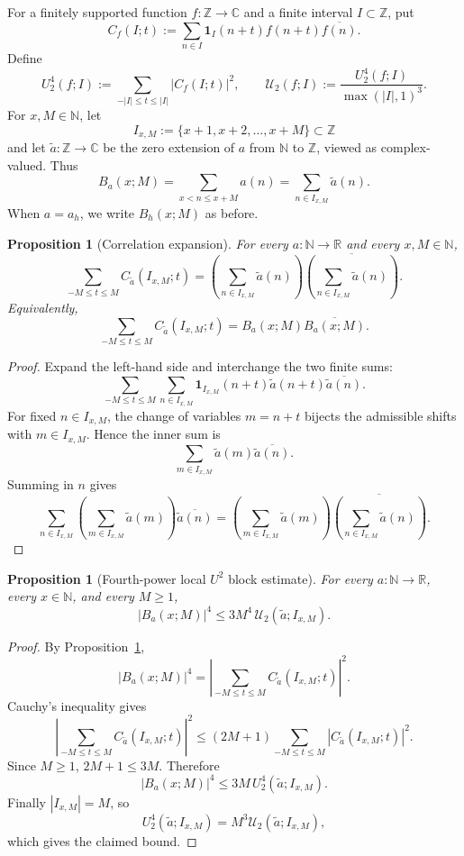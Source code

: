\documentclass[11pt]{scrartcl}
\numberwithin{equation}{section}
\newtheorem{proposition}[theorem]{Proposition}
\theoremstyle{definition}
\newcommand{\N}{\mathbb N}
\newcommand{\Z}{\mathbb Z}
\newcommand{\R}{\mathbb R}
\newcommand{\C}{\mathbb C}
\newcommand{\1}{\mathbf 1}
\newcommand{\abs}[1]{\left|#1\right|}
\begin{document}
For a finitely supported function $f:\Z\to\C$ and a finite interval $I\subset\Z$, put
\[
C_f(I;t):=\sum_{n\in I}\1_I(n+t)f(n+t)\overline{f(n)}.
\]
Define
\[
U_2^4(f;I):=\sum_{-|I|\le t\le |I|}\abs{C_f(I;t)}^2,
\qquad
\mathcal U_2(f;I):=\frac{U_2^4(f;I)}{\max(|I|,1)^3}.
\]
For $x,M\in\N$, let
\[
I_{x,M}:=\{x+1,x+2,\ldots,x+M\}\subset\Z
\]
and let $\widetilde a:\Z\to\C$ be the zero extension of $a$ from $\N$ to $\Z$, viewed as complex-valued. Thus
\[
B_a(x;M)=\sum_{x<n\le x+M}a(n)=\sum_{n\in I_{x,M}}\widetilde a(n).
\]
When $a=a_h$, we write $B_h(x;M)$ as before.

\begin{proposition}[Correlation expansion]
\label{prop:local-u2-correlation-expansion}
For every $a:\N\to\R$ and every $x,M\in\N$,
\[
\sum_{-M\le t\le M} C_{\widetilde a}(I_{x,M};t)
=
\left(\sum_{n\in I_{x,M}}\widetilde a(n)\right)
\overline{\left(\sum_{n\in I_{x,M}}\widetilde a(n)\right)}.
\]
Equivalently,
\[
\sum_{-M\le t\le M} C_{\widetilde a}(I_{x,M};t)
=B_a(x;M)\overline{B_a(x;M)}.
\]
\end{proposition}

\begin{proof}
Expand the left-hand side and interchange the two finite sums:
\[
\sum_{-M\le t\le M}\sum_{n\in I_{x,M}}
\1_{I_{x,M}}(n+t)\widetilde a(n+t)\overline{\widetilde a(n)}.
\]
For fixed $n\in I_{x,M}$, the change of variables $m=n+t$ bijects the admissible shifts with $m\in I_{x,M}$. Hence the inner sum is
\[
\sum_{m\in I_{x,M}}\widetilde a(m)\overline{\widetilde a(n)}.
\]
Summing in $n$ gives
\[
\sum_{n\in I_{x,M}}\left(\sum_{m\in I_{x,M}}\widetilde a(m)\right)
\overline{\widetilde a(n)}
=
\left(\sum_{m\in I_{x,M}}\widetilde a(m)\right)
\overline{\left(\sum_{n\in I_{x,M}}\widetilde a(n)\right)}.
\]
\end{proof}

\begin{proposition}[Fourth-power local $U^2$ block estimate]
\label{prop:local-u2-fourth-power-block}
For every $a:\N\to\R$, every $x\in\N$, and every $M\ge1$,
\[
\abs{B_a(x;M)}^4
\le
3M^4\,\mathcal U_2(\widetilde a;I_{x,M}).
\]
\end{proposition}

\begin{proof}
By Proposition~\ref{prop:local-u2-correlation-expansion},
\[
\abs{B_a(x;M)}^4
=
\left|\sum_{-M\le t\le M}C_{\widetilde a}(I_{x,M};t)\right|^2.
\]
Cauchy's inequality gives
\[
\left|\sum_{-M\le t\le M}C_{\widetilde a}(I_{x,M};t)\right|^2
\le
(2M+1)\sum_{-M\le t\le M}\abs{C_{\widetilde a}(I_{x,M};t)}^2.
\]
Since $M\ge1$, $2M+1\le3M$. Therefore
\[
\abs{B_a(x;M)}^4
\le
3M\,U_2^4(\widetilde a;I_{x,M}).
\]
Finally $|I_{x,M}|=M$, so
\[
U_2^4(\widetilde a;I_{x,M})
=M^3\mathcal U_2(\widetilde a;I_{x,M}),
\]
which gives the claimed bound.
\end{proof}
\end{document}
